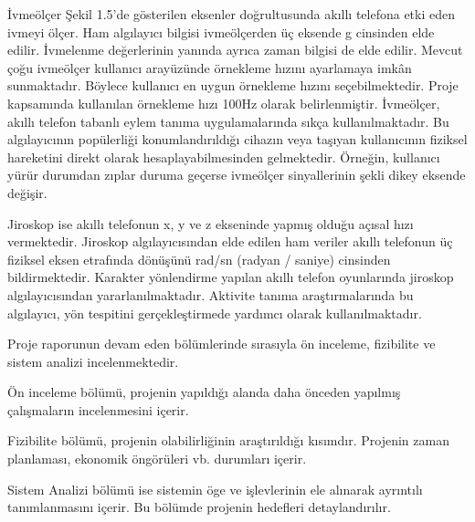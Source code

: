 \newpage

İvmeölçer Şekil 1.5’de gösterilen eksenler doğrultusunda akıllı telefona etki eden ivmeyi ölçer. Ham algılayıcı bilgisi ivmeölçerden üç eksende g cinsinden elde edilir. İvmelenme değerlerinin yanında ayrıca zaman bilgisi de elde edilir. Mevcut çoğu ivmeölçer kullanıcı arayüzünde örnekleme hızını ayarlamaya imkân sunmaktadır. Böylece kullanıcı en uygun örnekleme hızını seçebilmektedir. Proje kapsamında kullanılan örnekleme hızı 100Hz olarak belirlenmiştir.
İvmeölçer, akıllı telefon tabanlı eylem tanıma uygulamalarında sıkça kullanılmaktadır. Bu algılayıcının popülerliği konumlandırıldığı cihazın veya taşıyan kullanıcının fiziksel hareketini direkt olarak hesaplayabilmesinden gelmektedir. Örneğin, kullanıcı yürür durumdan zıplar duruma geçerse ivmeölçer sinyallerinin şekli dikey eksende değişir.


Jiroskop ise akıllı telefonun x, y ve z ekseninde yapmış olduğu açısal hızı vermektedir. Jiroskop algılayıcısından elde edilen ham veriler akıllı telefonun üç fiziksel eksen etrafında dönüşünü rad/sn (radyan / saniye) cinsinden bildirmektedir. Karakter yönlendirme yapılan akıllı telefon oyunlarında jiroskop algılayıcısından yararlanılmaktadır. Aktivite tanıma araştırmalarında bu algılayıcı, yön tespitini gerçekleştirmede yardımcı olarak kullanılmaktadır.

Proje raporunun devam eden bölümlerinde sırasıyla ön inceleme, fizibilite ve sistem analizi incelenmektedir.

Ön inceleme bölümü,  projenin yapıldığı alanda daha önceden yapılmış çalışmaların incelenmesini içerir.

Fizibilite bölümü, projenin olabilirliğinin araştırıldığı kısımdır. Projenin zaman planlaması, ekonomik öngörüleri vb. durumları içerir.

Sistem Analizi bölümü ise  sistemin öge ve işlevlerinin ele alınarak ayrıntılı tanımlanmasını içerir. Bu bölümde projenin hedefleri detaylandırılır.
